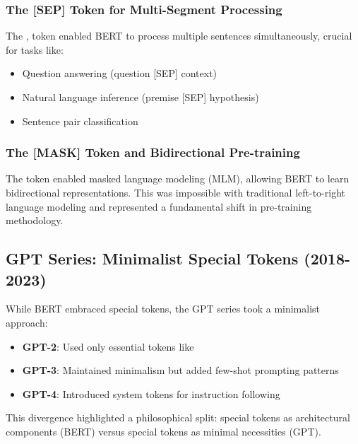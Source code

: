 \subsubsection{The [SEP] Token for Multi-Segment Processing}
The \sep{} token enabled BERT to process multiple sentences simultaneously, crucial for tasks like:
\begin{itemize}
\item Question answering (question [SEP] context)
\item Natural language inference (premise [SEP] hypothesis)
\item Sentence pair classification
\end{itemize}

\subsubsection{The [MASK] Token and Bidirectional Pre-training}
The \mask{} token enabled masked language modeling (MLM), allowing BERT to learn bidirectional representations. This was impossible with traditional left-to-right language modeling and represented a fundamental shift in pre-training methodology.

\subsection{GPT Series: Minimalist Special Tokens (2018-2023)}

While BERT embraced special tokens, the GPT series \citep{radford2019language} took a minimalist approach:

\begin{itemize}
\item \textbf{GPT-2}: Used only essential tokens like 
\item \textbf{GPT-3}: Maintained minimalism but added few-shot prompting patterns
\item \textbf{GPT-4}: Introduced system tokens for instruction following
\end{itemize}

This divergence highlighted a philosophical split: special tokens as architectural components (BERT) versus special tokens as minimal necessities (GPT).

